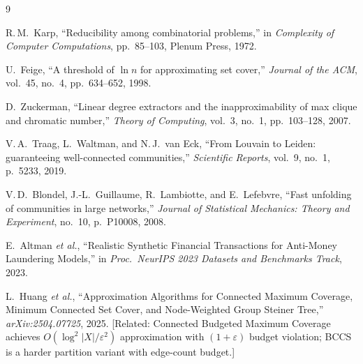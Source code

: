\documentclass[11pt]{article}
\begin{document}
\begin{thebibliography}{9}

R.\,M.~Karp,
``Reducibility among combinatorial problems,''
in \emph{Complexity of Computer Computations},
pp.~85--103, Plenum Press, 1972.

U.~Feige,
``A threshold of $\ln n$ for approximating set cover,''
\emph{Journal of the ACM}, vol.~45, no.~4, pp.~634--652, 1998.

D.~Zuckerman,
``Linear degree extractors and the inapproximability of max clique
and chromatic number,''
\emph{Theory of Computing}, vol.~3, no.~1, pp.~103--128, 2007.

V.\,A.~Traag, L.~Waltman, and N.\,J.~van Eck,
``From Louvain to Leiden: guaranteeing well-connected communities,''
\emph{Scientific Reports}, vol.~9, no.~1, p.~5233, 2019.

V.\,D.~Blondel, J.-L.~Guillaume, R.~Lambiotte, and E.~Lefebvre,
``Fast unfolding of communities in large networks,''
\emph{Journal of Statistical Mechanics: Theory and Experiment},
no.~10, p.~P10008, 2008.

E.~Altman \emph{et al.},
``Realistic Synthetic Financial Transactions for Anti-Money Laundering
Models,''
in \emph{Proc.\ NeurIPS 2023 Datasets and Benchmarks Track}, 2023.

L.~Huang \emph{et al.},
``Approximation Algorithms for Connected Maximum Coverage, Minimum
Connected Set Cover, and Node-Weighted Group Steiner Tree,''
\emph{arXiv:2504.07725}, 2025.
[Related: Connected Budgeted Maximum Coverage achieves
$O(\log^2|X|/\varepsilon^2)$ approximation with $(1+\varepsilon)$
budget violation; BCCS is a harder partition variant with edge-count
budget.]

\end{thebibliography}
\end{document}
